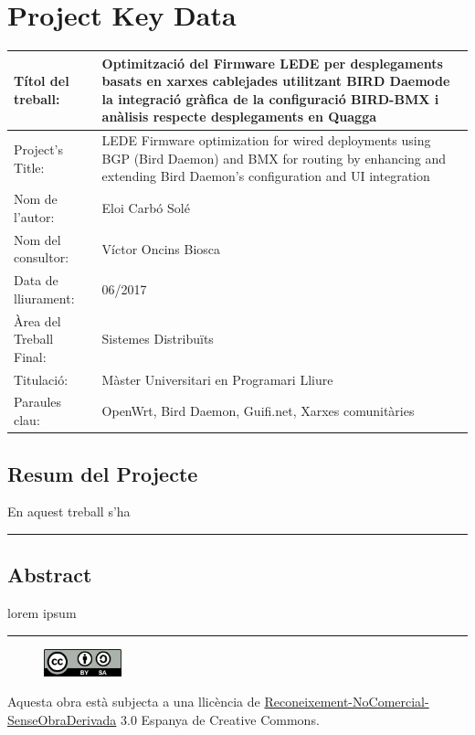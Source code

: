 \chapter*{Project Key Data}
\thispagestyle{empty}
\begin{table}[htbp]
\centering
\begin{tabular}{|>{\columncolor[gray]{0.8}}p{3.7cm}|p{9cm}|}
\hline
Títol del treball: & Optimització del Firmware LEDE per desplegaments basats en xarxes cablejades utilitzant BIRD Daemode la integració gràfica de la configuració BIRD-BMX i anàlisis respecte desplegaments en Quagga \\ \hline
Project's Title: & LEDE Firmware optimization for wired deployments using BGP (Bird Daemon) and BMX for routing by enhancing and extending Bird Daemon's configuration and UI integration \\ \hline
Nom de l'autor: & Eloi Carb\'{o} Sol\'{e} \\ \hline
Nom del consultor: & Víctor Oncins Biosca \\ \hline
Data de lliurament: & 06/2017\\ \hline
\`{A}rea del Treball Final: & Sistemes Distribu\"{i}ts \\ \hline
Titulació: & M\`{a}ster Universitari en Programari Lliure \\ \hline
Paraules clau: & OpenWrt, Bird Daemon, Guifi.net, Xarxes comunit\`{a}ries \\ \hline
\end{tabular}
\end{table}

\newpage
\section*{Resum del Projecte}
\thispagestyle{empty}
En aquest treball s'ha 




\noindent\rule{\textwidth}{0.4pt}

\section*{Abstract}
\thispagestyle{empty}

lorem ipsum

\noindent\rule{\textwidth}{0.4pt}


\newpage
\thispagestyle{empty}
\par\vspace*{\fill}
\begin{figure}[ht!]
    \centering
    \includegraphics[width=0.2\textwidth]{images/CC/ccbysa}
\end{figure}
\noindent
Aquesta obra està subjecta a una llicència de \href{https://creativecommons.org/licenses/by-nc-nd/3.0/es/}{Reconeixement-NoComercial-SenseObraDerivada} 3.0 Espanya de Creative Commons.

